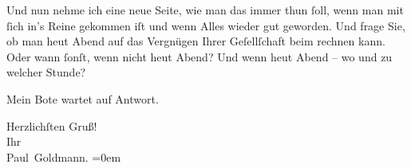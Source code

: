 \pstart
           {\pb}Und nun nehme ich eine neue Seite, \strikeout{\textcolor{gray}{aus}} wie man das immer thun{ }ſoll, wenn man mit{ }ſich in’s Reine gekommen iſt und
               wenn Alles wieder gut geworden. Und frage Sie, ob man heut{ }Abend auf das Vergnügen Ihrer Geſellſchaft beim \label{K_L02645-2v}\label{K_L02645-2} rechnen\strikeout{\textcolor{gray}{×}} kann. Oder wann{ }ſonſt, wenn nicht heut{ }Abend? Und wenn heut{ }Abend – wo und zu welcher Stunde?\pend
           
\pstart
           Mein Bote wartet auf Antwort.\pend
           
\pstart
           Herzlichſten Gruß! {\\[\baselineskip]}Ihr {\\[\baselineskip]}\spacefill\mbox{Paul Goldmann.}\pend
           \leftskip=0em{}\endnumbering{}  \newcommand{\dateiname}{L02645}\newcommand{\titel}{Paul Goldmann an Arthur Schnitzler, 7. 12. 1889}\newcommand{\editorInnen}{Martin Anton Müller und Laura Untner}
